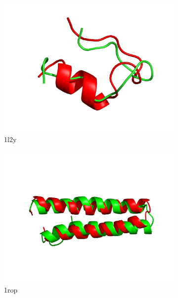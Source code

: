 \begin{figure}
  \begin{subfigure}{0.32\linewidth}
    \centering
    \includegraphics[width=0.9\linewidth]{Figuras/prots/1l2y_render.png}
    \caption{1l2y}
    \label{fig:1l2y-conformation}
  \end{subfigure}
%
  \begin{subfigure}{0.32\linewidth}
    \centering
    \includegraphics[width=0.9\linewidth]{Figuras/prots/1rop_render.png}
    \caption{1rop}
    \label{fig:1rop-conformation}
  \end{subfigure}
%
  \begin{subfigure}{0.32\linewidth}
    \centering

\end{subfigure}
\end{figure}
